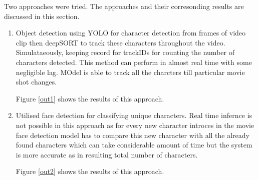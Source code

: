 \documentclass[twoside,english]{article}
\begin{document}
    \vspace{-0.3cm}
    Two approaches were tried. The approaches and their corresonding results are discussed in this section.
    \begin{enumerate} 
    \setlength{\itemsep}{0.5mm}
        \item Object detection using YOLO for character detection from frames of video clip then deepSORT to track these characters throughout the video. Simulataeously, keeping record for trackIDs for counting the number of characters detected. This method can perform in almost real time with some negligible lag. MOdel is able to track all the charcters till particular movie shot changes.
        
        Figure \ref{out1} shows the results of this approach.

        \item Utilised face detection for classifying unique characters. Real time infernce is not possible in this approach as for every new character introces in the movie face detection model has to compare this new character with all the already found characters which can take considerable amount of time but the system is more accurate as in resulting total number of characters. 
        
        Figure \ref{out2} shows the results of this approach.
    \end{enumerate}
\end{document}
